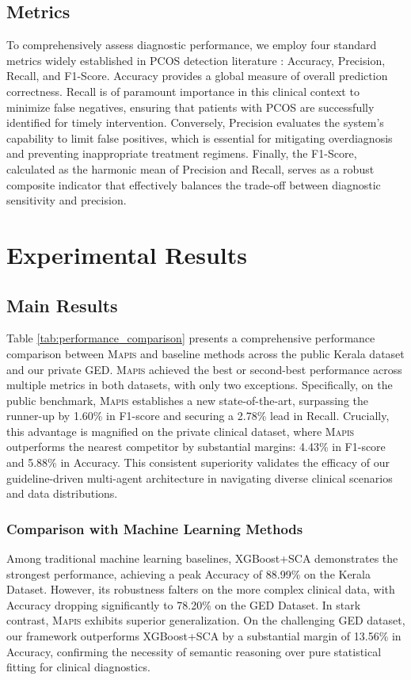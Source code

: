 \documentclass[a4paper,fleqn]{cas-dc}
\begin{document}
\subsection{Metrics}
To comprehensively assess diagnostic performance, we employ four standard metrics widely established in PCOS detection literature \cite{tiwari2022sposds}: Accuracy, Precision, Recall, and F1-Score. Accuracy provides a global measure of overall prediction correctness. Recall is of paramount importance in this clinical context to minimize false negatives, ensuring that patients with PCOS are successfully identified for timely intervention. Conversely, Precision evaluates the system's capability to limit false positives, which is essential for mitigating overdiagnosis and preventing inappropriate treatment regimens. Finally, the F1-Score, calculated as the harmonic mean of Precision and Recall, serves as a robust composite indicator that effectively balances the trade-off between diagnostic sensitivity and precision.

\section{Experimental Results}



\subsection{Main Results}
Table \ref{tab:performance_comparison} presents a comprehensive performance comparison between \textsc{Mapis} and baseline methods across the public Kerala dataset and our private GED. \textsc{Mapis} achieved the best or second-best performance across multiple metrics in both datasets, with only two exceptions. Specifically, on the public benchmark, \textsc{Mapis} establishes a new state-of-the-art, surpassing the runner-up by 1.60\% in F1-score and securing a 2.78\% lead in Recall. Crucially, this advantage is magnified on the private clinical dataset, where \textsc{Mapis} outperforms the nearest competitor by substantial margins: 4.43\% in F1-score and 5.88\% in Accuracy. This consistent superiority validates the efficacy of our guideline-driven multi-agent architecture in navigating diverse clinical scenarios and data distributions.

\subsubsection{Comparison with Machine Learning Methods}\label{vsmachine}
Among traditional machine learning baselines, XGBoost+SCA demonstrates the strongest performance, achieving a peak Accuracy of 88.99\% on the Kerala Dataset. However, its robustness falters on the more complex clinical data, with Accuracy dropping significantly to 78.20\% on the GED Dataset. In stark contrast, \textsc{Mapis} exhibits superior generalization. On the challenging GED dataset, our framework outperforms XGBoost+SCA by a substantial margin of 13.56\% in Accuracy, confirming the necessity of semantic reasoning over pure statistical fitting for clinical diagnostics.
\end{document}
